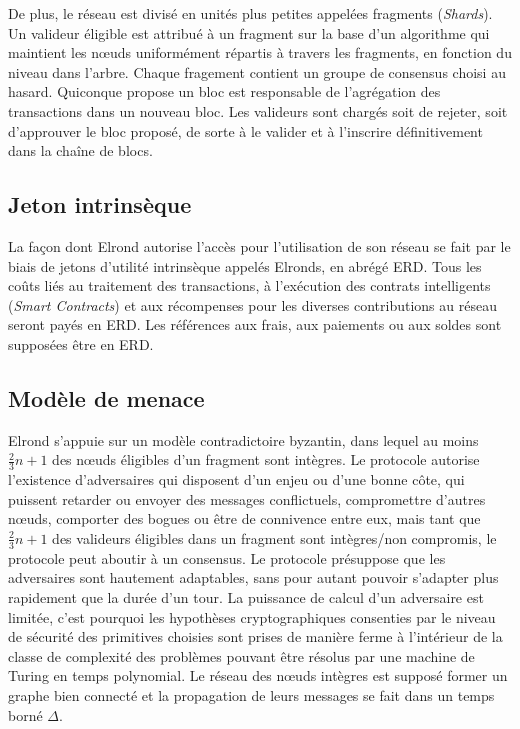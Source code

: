 \documentclass[journal]{IEEEtran}
\begin{document}
De plus, le réseau est divisé en unités plus petites appelées fragments (\textit{Shards}). Un valideur éligible est attribué à un fragment sur la base d'un algorithme qui maintient les nœuds uniformément répartis à travers les fragments, en fonction du niveau dans l'arbre. Chaque fragement contient un groupe de consensus choisi au hasard. Quiconque propose un bloc est responsable de l'agrégation des transactions dans un nouveau bloc. Les valideurs sont chargés soit de rejeter, soit d'approuver le bloc proposé, de sorte à le valider et à l’inscrire définitivement dans la chaîne  de blocs.

\subsection{Jeton intrinsèque} 
La façon dont Elrond autorise l'accès pour l’utilisation de son réseau se fait par le biais de jetons d’utilité intrinsèque appelés Elronds, en abrégé ERD. Tous les coûts liés au traitement des transactions, à l'exécution des contrats intelligents (\textit{Smart Contracts}) et aux récompenses pour les diverses contributions au réseau seront payés en ERD. Les références aux frais, aux paiements ou aux soldes sont supposées être en ERD.

\subsection{Modèle de menace} 
Elrond s’appuie sur un modèle contradictoire byzantin, dans lequel au moins $\frac{2}{3}n+1$ des nœuds éligibles d'un fragment sont intègres. Le protocole autorise l'existence d'adversaires qui disposent d’un enjeu ou d’une bonne côte, qui puissent retarder ou envoyer des messages conflictuels, compromettre d'autres nœuds, comporter des bogues ou être de connivence entre eux, mais tant que $\frac{2}{3}n+1$ des valideurs éligibles dans un fragment sont intègres/non compromis, le protocole peut aboutir à un consensus.
Le protocole présuppose que les adversaires sont hautement adaptables, sans pour autant pouvoir s'adapter plus rapidement que la durée d'un tour. La puissance de calcul d'un adversaire est limitée, c'est pourquoi les hypothèses cryptographiques consenties par le niveau de sécurité des primitives choisies sont prises de manière ferme à l’intérieur de la classe de complexité des problèmes pouvant être résolus par une machine de Turing en temps polynomial. Le réseau des nœuds intègres est supposé former un graphe bien connecté et la propagation de leurs messages se fait dans un temps borné $\Delta$.
\end{document}
